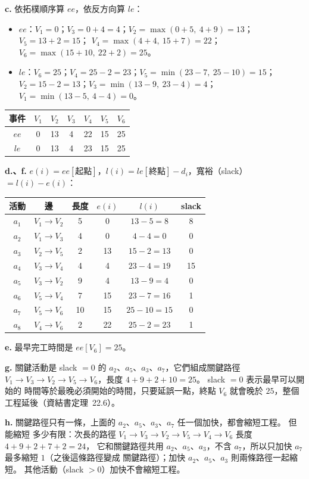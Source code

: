 \begin{pastsoln}
\textbf{c.} 依拓樸順序算 $ee$，依反方向算 $le$：
\begin{itemize}
\item $ee$：$V_1 = 0$；$V_3 = 0 + 4 = 4$；$V_2 = \max(0 + 5,\ 4 + 9) = 13$；$V_5 = 13 + 2 = 15$；
$V_4 = \max(4 + 4,\ 15 + 7) = 22$；$V_6 = \max(15 + 10,\ 22 + 2) = 25$。
\item $le$：$V_6 = 25$；$V_4 = 25 - 2 = 23$；$V_5 = \min(23 - 7,\ 25 - 10) = 15$；
$V_2 = 15 - 2 = 13$；$V_3 = \min(13 - 9,\ 23 - 4) = 4$；$V_1 = \min(13 - 5,\ 4 - 4) = 0$。
\end{itemize}
\begin{center}
\begin{tabular}{ccccccc}
\toprule
事件 & $V_1$ & $V_2$ & $V_3$ & $V_4$ & $V_5$ & $V_6$ \\
\midrule
$ee$ & 0 & 13 & 4 & 22 & 15 & 25 \\
$le$ & 0 & 13 & 4 & 23 & 15 & 25 \\
\bottomrule
\end{tabular}
\end{center}

\textbf{d.、f.} $e(i) = ee[\text{起點}]$，$l(i) = le[\text{終點}] - d_i$，寬裕（slack）$= l(i) - e(i)$：
\begin{center}
\begin{tabular}{cccccc}
\toprule
活動 & 邊 & 長度 & $e(i)$ & $l(i)$ & slack \\
\midrule
$a_1$ & $V_1 \to V_2$ & 5  & 0  & $13 - 5 = 8$   & 8 \\
$a_2$ & $V_1 \to V_3$ & 4  & 0  & $4 - 4 = 0$    & 0 \\
$a_3$ & $V_2 \to V_5$ & 2  & 13 & $15 - 2 = 13$  & 0 \\
$a_4$ & $V_3 \to V_4$ & 4  & 4  & $23 - 4 = 19$  & 15 \\
$a_5$ & $V_3 \to V_2$ & 9  & 4  & $13 - 9 = 4$   & 0 \\
$a_6$ & $V_5 \to V_4$ & 7  & 15 & $23 - 7 = 16$  & 1 \\
$a_7$ & $V_5 \to V_6$ & 10 & 15 & $25 - 10 = 15$ & 0 \\
$a_8$ & $V_4 \to V_6$ & 2  & 22 & $25 - 2 = 23$  & 1 \\
\bottomrule
\end{tabular}
\end{center}

\textbf{e.} 最早完工時間是 $ee[V_6] = 25$。

\textbf{g.} 關鍵活動是 slack $= 0$ 的 $a_2$、$a_5$、$a_3$、$a_7$，它們組成關鍵路徑
$V_1 \to V_3 \to V_2 \to V_5 \to V_6$，長度 $4 + 9 + 2 + 10 = 25$。 slack $= 0$ 表示最早可以開始的
時間等於最晚必須開始的時間，只要延誤一點，終點 $V_6$ 就會晚於 $25$，整個工程延後（資結書定理~22.6）。

\textbf{h.} 關鍵路徑只有一條，上面的 $a_2$、$a_5$、$a_3$、$a_7$ 任一個加快，都會縮短工程。 但能縮短
多少有限：次長的路徑 $V_1 \to V_3 \to V_2 \to V_5 \to V_4 \to V_6$ 長度 $4 + 9 + 2 + 7 + 2 = 24$，
它和關鍵路徑共用 $a_2$、$a_5$、$a_3$，不含 $a_7$，所以只加快 $a_7$ 最多縮短 $1$（之後這條路徑變成
關鍵路徑）；加快 $a_2$、$a_5$、$a_3$ 則兩條路徑一起縮短。 其他活動（slack $> 0$）加快不會縮短工程。
\end{pastsoln}
